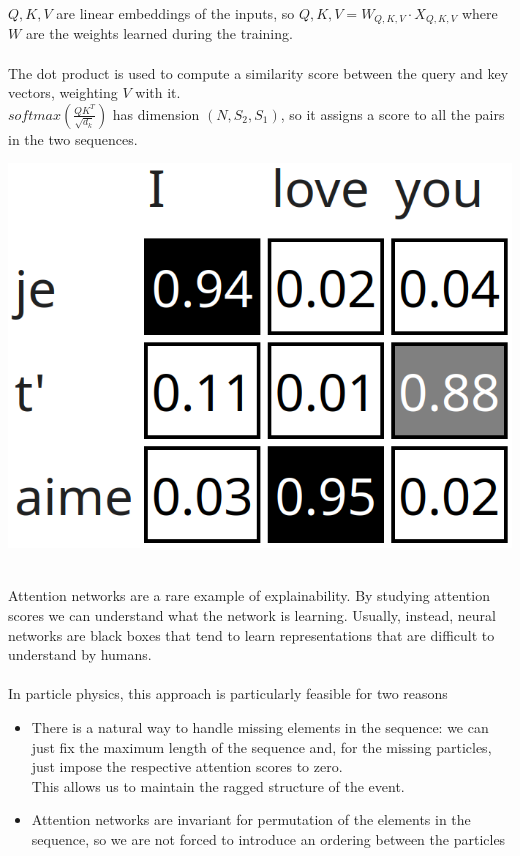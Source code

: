 \begin{minipage}{\linewidth}
    \begin{minipage}{0.53\linewidth}
        $Q,K,V$ are linear embeddings of the inputs, so $Q,K,V=W_{Q,K,V} \cdot X_{Q,K,V}$ where $W$ are the weights learned during the training.\\
        \\
        The dot product is used to compute a similarity score between the query and key vectors, weighting $V$ with it.\\
        $\textit{softmax}\left(\frac{QK^T}{\sqrt{d_k}}\right)$ has dimension $(N,S_2,S_1)$, so it assigns a score to all the pairs in the two sequences.\\
    \end{minipage}
    \hfill
    \begin{minipage}{0.43\linewidth}
        \vspace{-0.7cm}
        \centering
        \includegraphics[width=0.5\linewidth]{fig//chap05-stats/translation.png}
        \vspace{0.6cm}
        \label{fig:Translation}
    \end{minipage}
\end{minipage}
\vspace{0.1cm}\\
Attention networks are a rare example of explainability. By studying attention scores we can understand what the network is learning. Usually, instead, neural networks are black boxes that tend to learn representations that are difficult to understand by humans.
\\
\\
In particle physics, this approach is particularly feasible for two reasons
\begin{itemize}
    \item There is a natural way to handle missing elements in the sequence: we can just fix the maximum length of the sequence and, for the missing particles, just impose the respective attention scores to zero.\\
    This allows us to maintain the ragged structure of the event.
    \item Attention networks are invariant for permutation of the elements in the sequence, so we are not forced to introduce an ordering between the particles
\end{itemize}


